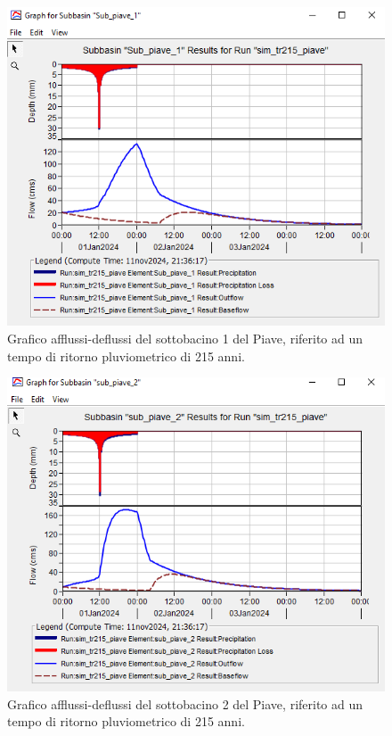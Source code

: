     \begin{figure}[H]\centering
        \includegraphics[scale=1]{immagini/sub1_piave_215.PNG}
        \caption{Grafico afflussi-deflussi del sottobacino 1 del Piave, riferito ad un tempo di ritorno pluviometrico di 215 anni.}
            \label{sub1_piave_215}    
    \end{figure}    

\begin{figure}[H]\centering
        \includegraphics[scale=1]{immagini/sub2_piave_215.PNG}
        \caption{Grafico afflussi-deflussi del sottobacino 2 del Piave, riferito ad un tempo di ritorno pluviometrico di 215 anni.}
            \label{sub2_piave_215}    
\end{figure}
    
